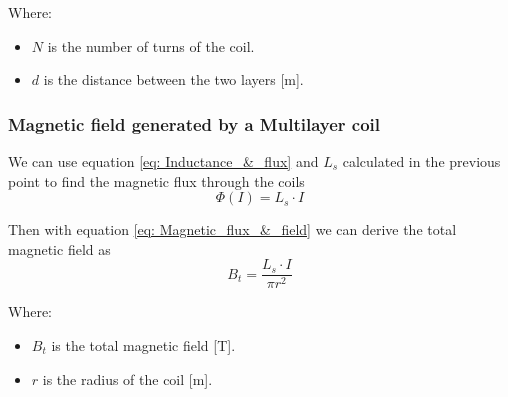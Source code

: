 Where:
\begin{itemize}
    \item \( N \) is the number of turns of the coil.
    \item \( d \) is the distance between the two layers [m].
\end{itemize}

\subsubsection{Magnetic field generated by a Multilayer coil}
We can use equation \eqref{eq: Inductance_&_flux} and $L_s$ calculated in the previous point to find the magnetic flux through the coils
\begin{equation}
    \Phi(I) = L_s \cdot I
\end{equation}

Then with equation \eqref{eq: Magnetic_flux_&_field} we can derive the total magnetic field as
\begin{equation}
    B_t = \frac{L_s \cdot I}{\pi r^2}
\end{equation}

Where:
\begin{itemize}
    \item \( B_t \) is the total magnetic field [T].
    \item \( r \) is the radius of the coil [m].
\end{itemize}




